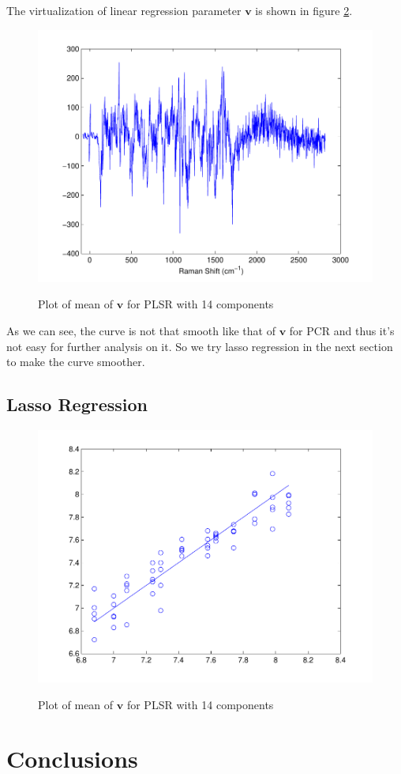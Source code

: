\documentclass[a4paper]{article}
\newcommand{\bfv}{\mathbf{v}}
\begin{document}
The virtualization of linear regression parameter $\bfv$ is shown in figure \ref{pic7}.
\begin{figure}[h]
  \centering
  \includegraphics[width=.6\textwidth]{images/v_plsrnormcmp14smse007519.pdf}\\
  \caption{Plot of mean of $\bfv$ for PLSR with 14 components}\label{pic7}
\end{figure}

As we can see, the curve is not that smooth like that of $\bfv$ for PCR and thus it's not easy for further analysis on it. So we try lasso regression in the next section to make the curve smoother.

\subsection{Lasso Regression}
\begin{figure}[h]
  \centering
  \includegraphics[width=.6\textwidth]{images/pred_lasso0007smse002396.pdf}\\
  \caption{Plot of mean of $\bfv$ for PLSR with 14 components}\label{pic7}
\end{figure}

\section{Conclusions}
\end{document}
